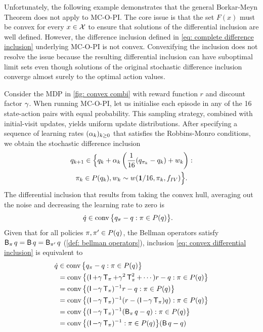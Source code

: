 Unfortunately, the following example demonstrates that the general Borkar-Meyn Theorem does not apply to MC-O-PI.
The core issue is that the set $F(x)$ must be convex for every $x \in \mathcal{X}$ to ensure that solutions of the differential inclusion are well defined. However, the difference inclusion defined in \eqref{eq: complete difference inclusion} underlying MC-O-PI is not convex. 
Convexifying the inclusion does not resolve the issue because the resulting differential inclusion can have suboptimal limit sets even though solutions of the original stochastic difference inclusion converge almost surely to the optimal action values.

Consider the MDP in \autoref{fig: convex combi} with reward function $r$ and discount factor $\gamma$.
When running MC-O-PI, let us initialise each episode in any of the 16 state-action pairs with equal probability.
This sampling strategy, combined with initial-visit updates, yields uniform update distributions.
After specifying a sequence of learning rates $(\alpha_k)_{k \ge 0}$ that satisfies the Robbins-Monro conditions, we obtain the stochastic difference inclusion
\begin{multline}
\label{eq: ex no borkar meyn}
    q_{{k+1}}
    \in
    \Big\{ 
    q_k + \alpha_k \left( \dfrac{1}{16} ( q_{\pi_k} - q_k) + w_k \right) 
    :
    \\
    \pi_k \in P(q_k),
    w_k \sim w(\mathbf{1}/16, \pi_k, f_{IV})
    \Big\} .
\end{multline}
The differential inclusion that results from taking the convex hull, averaging out the noise and decreasing the learning rate to zero is
\begin{align}
\label{eq: convex differential inclusion}
    \Dot{q} &\in \operatorname*{\textup{conv}} \big\{ q_\pi - q : \pi \in P(q) \big\} .
\end{align}
Given that for all policies $\pi, \pi' \in P(q)$, the Bellman operators 
satisfy $\operatorname{\mathsf{B}}_\pi q = \operatorname{\mathsf{B}} q = \operatorname{\mathsf{B}}_{\pi'} q$ (\autoref{def: bellman operators}),
inclusion \eqref{eq: convex differential inclusion} is equivalent to
\begin{align*}
    \Dot{q} 
    &\in \operatorname*{\textup{conv}} \big\{ q_\pi - q : \pi \in P(q) \big\} 
    \\
    &= \operatorname*{\textup{conv}} \big\{ (\operatorname{\mathsf{I}} + \gamma \operatorname{\mathsf{T}}_\pi + \gamma^2 \operatorname{\mathsf{T}}_\pi^2 + \cdots) r - q : \pi \in P(q) \big\}
    \\
    &= \operatorname*{\textup{conv}} \big\{ (\operatorname{\mathsf{I}} - \gamma \operatorname{\mathsf{T}}_\pi)^{-1} r - q : \pi \in P(q) \big\}
    \\
    &= \operatorname*{\textup{conv}} \big\{ (\operatorname{\mathsf{I}}-\gamma \operatorname{\mathsf{T}}_\pi)^{-1} ( r - (\operatorname{\mathsf{I}}-\gamma \operatorname{\mathsf{T}}_\pi) q ) : \pi \in P(q) \big\}
    \\
    &= \operatorname*{\textup{conv}} \big\{ (\operatorname{\mathsf{I}}-\gamma \operatorname{\mathsf{T}}_\pi)^{-1} ( \operatorname{\mathsf{B}}_\pi q - q) : \pi \in P(q) \big\} 
    \\
    &= \operatorname*{\textup{conv}} \big\{ ( \operatorname{\mathsf{I}}-\gamma \operatorname{\mathsf{T}}_\pi)^{-1} : \pi \in P(q) \big\} ( \operatorname{\mathsf{B}} q - q )
\end{align*}

